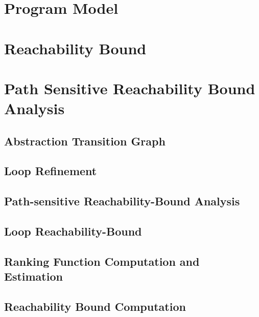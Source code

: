 \documentclass[acmsmall]{acmart}
\begin{document}
\section{{Program Model}}
\label{sec:language}

\section{{Reachability Bound}}
\label{sec:rb-def}

\section{Path Sensitive Reachability Bound Analysis}
\label{sec:psrb-alg}

% 
    \subsection{Abstraction Transition Graph}
    \label{sec:progabs}
    
    \subsection{Loop Refinement}
    \label{sec:refine}
    
    \subsection{Path-sensitive Reachability-Bound Analysis}
    \label{sec:psrb}
    
    \subsection{Loop Reachability-Bound}
    \label{sec:looprb}
    
    \subsection{Ranking Function Computation and Estimation}
    \label{sec:rank}
    
    \subsection{Reachability Bound Computation}
    \label{sec:alg-rb}
    
\end{document}
